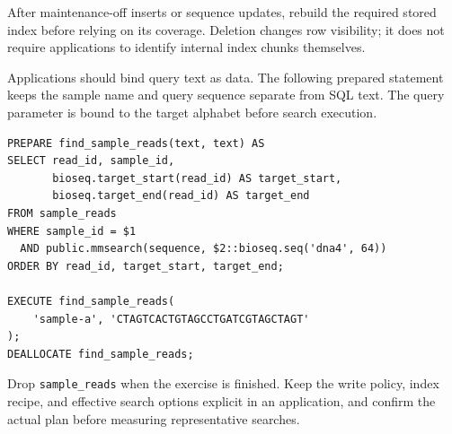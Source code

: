 After maintenance-off inserts or sequence updates, rebuild the required
stored index before relying on its coverage. Deletion changes row visibility;
it does not require applications to identify internal index chunks themselves.

Applications should bind query text as data. The following prepared statement
keeps the sample name and query sequence separate from SQL text. The query
parameter is bound to the target alphabet before search execution.

\par\noindent\begin{minipage}{\linewidth}
\begin{lstlisting}[style=bioseq-appendix-sql]
PREPARE find_sample_reads(text, text) AS
SELECT read_id, sample_id,
       bioseq.target_start(read_id) AS target_start,
       bioseq.target_end(read_id) AS target_end
FROM sample_reads
WHERE sample_id = $1
  AND public.mmsearch(sequence, $2::bioseq.seq('dna4', 64))
ORDER BY read_id, target_start, target_end;

EXECUTE find_sample_reads(
    'sample-a', 'CTAGTCACTGTAGCCTGATCGTAGCTAGT'
);
DEALLOCATE find_sample_reads;
\end{lstlisting}
\end{minipage}

Drop \texttt{sample\_reads} when the exercise is finished.
Keep the write policy, index recipe, and
effective search options explicit in an application, and confirm the actual
plan before measuring representative searches.
